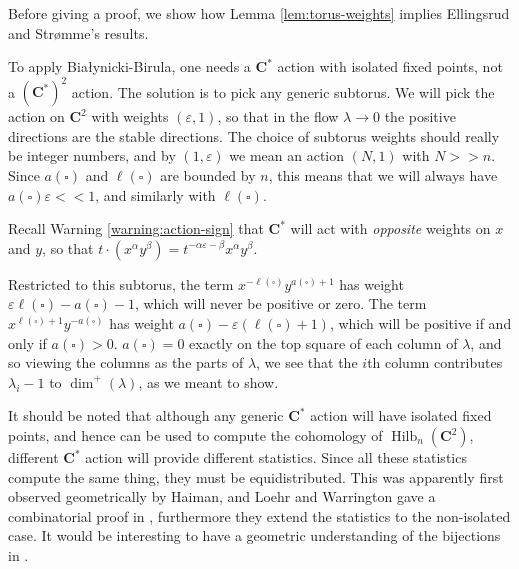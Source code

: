 \documentclass{amsart}[12pt]
\theoremstyle{definition}
\newcommand{\C}{\mathbf{C}}
\DeclareMathOperator{\Hilb}{Hilb}
\begin{document}
Before giving a proof, we show how Lemma \ref{lem:torus-weights} implies Ellingsrud and Str\o mme's results. 

To apply Bia\l ynicki-Birula, one needs a $\C^*$ action with isolated fixed points, not a $(\C^*)^2$ action.  The solution is to pick any generic subtorus.  We will pick the action on $\C^2$ with weights $(\varepsilon,1)$, so that in the flow $\lambda\to 0$ the positive directions are the stable directions.  The choice of subtorus weights should really be integer numbers, and by $(1,\varepsilon)$ we mean an action $(N,1)$ with $N>>n$. Since $a(\square)$ and $\ell(\square)$ are bounded by $n$, this means that we will always have $a(\square)\varepsilon<<1$, and similarly with $\ell(\square)$.

Recall Warning \ref{warning:action-sign} that $\C^*$ will act with \emph{opposite} weights on $x$ and $y$, so that $t\cdot(x^\alpha y^\beta)=t^{-\alpha\varepsilon-\beta}x^\alpha y^\beta$.  

Restricted to this subtorus, the term $x^{-\ell(\square)} y^{a(\square)+1}$ has weight $\varepsilon\ell(\square)-a(\square)-1$, which will never be positive or zero.  The term $x^{\ell(\square)+1}y^{-a(\square)}$ has weight $a(\square)-\varepsilon(\ell(\square)+1)$, which will be positive if and only if $a(\square)>0$.  $a(\square)=0$ exactly on the top square of each column of $\lambda$, and so viewing the columns as the parts of $\lambda$, we see that the $i$th column contributes $\lambda_i-1$ to $\dim^+(\lambda)$, as we meant to show.



\begin{center}
\end{center}



It should be noted that although any generic $\C^*$ action will have isolated fixed points, and hence can be used to compute the cohomology of $\Hilb_n(\C^2)$, different $\C^*$ action will provide different statistics.  Since all these statistics compute the same thing, they must be equidistributed.  This was apparently first observed geometrically by Haiman, and Loehr and Warrington gave a combinatorial proof in \cite{LW}, furthermore they extend the statistics to the non-isolated case.  It would be interesting to have a geometric understanding of the bijections in \cite{LW}.
\end{document}
